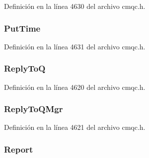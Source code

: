 Definición en la línea 4630 del archivo cmqc.\+h.

\hypertarget{structtag_m_q_m_d2_aec51e7b9face9480a893ae5d47781ee7}{}
\subsubsection[{Put\+Time}]{ Put\+Time}\label{structtag_m_q_m_d2_aec51e7b9face9480a893ae5d47781ee7}


Definición en la línea 4631 del archivo cmqc.\+h.

\hypertarget{structtag_m_q_m_d2_a7073875015f870e1d1a02e988ce698b3}{}
\subsubsection[{Reply\+To\+Q}]{ Reply\+To\+Q}\label{structtag_m_q_m_d2_a7073875015f870e1d1a02e988ce698b3}


Definición en la línea 4620 del archivo cmqc.\+h.

\hypertarget{structtag_m_q_m_d2_a9364487d587c0a06d95c25d1ae05a0be}{}
\subsubsection[{Reply\+To\+Q\+Mgr}]{ Reply\+To\+Q\+Mgr}\label{structtag_m_q_m_d2_a9364487d587c0a06d95c25d1ae05a0be}


Definición en la línea 4621 del archivo cmqc.\+h.

\hypertarget{structtag_m_q_m_d2_a3e6ae3e2f087fe6fc26cc75004fbc790}{}
\subsubsection[{Report}]{ Report}\label{structtag_m_q_m_d2_a3e6ae3e2f087fe6fc26cc75004fbc790}


